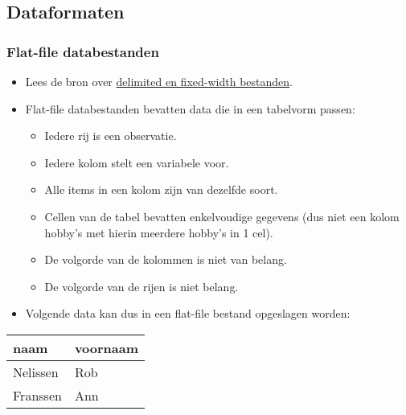 \documentclass[]{memoir}
\providecommand{\tightlist}{%
  \setlength{\itemsep}{0pt}\setlength{\parskip}{0pt}}
\begin{document}
\subsection{Dataformaten}\label{dataformaten}

\subsubsection{Flat-file databestanden}\label{flat-file-databestanden}

\begin{itemize}
\tightlist
\item
  Lees de bron over
  \href{https://www.techwalla.com/articles/what-is-a-delimited-a-fixed-width-file}{delimited
  en fixed-width bestanden}.
\item
  Flat-file databestanden bevatten data die in een tabelvorm passen:

  \begin{itemize}
  \tightlist
  \item
    Iedere rij is een observatie.
  \item
    Iedere kolom stelt een variabele voor.
  \item
    Alle items in een kolom zijn van dezelfde soort.
  \item
    Cellen van de tabel bevatten enkelvoudige gegevens (dus niet een
    kolom hobby's met hierin meerdere hobby's in 1 cel).
  \item
    De volgorde van de kolommen is niet van belang.
  \item
    De volgorde van de rijen is niet belang.
  \end{itemize}
\item
  Volgende data kan dus in een flat-file bestand opgeslagen worden:
\end{itemize}

\begin{longtable}[]{@{}ll@{}}
\toprule
naam & voornaam\tabularnewline
\midrule
\endhead
Nelissen & Rob\tabularnewline
Franssen & Ann\tabularnewline
\bottomrule
\end{longtable}
\end{document}
